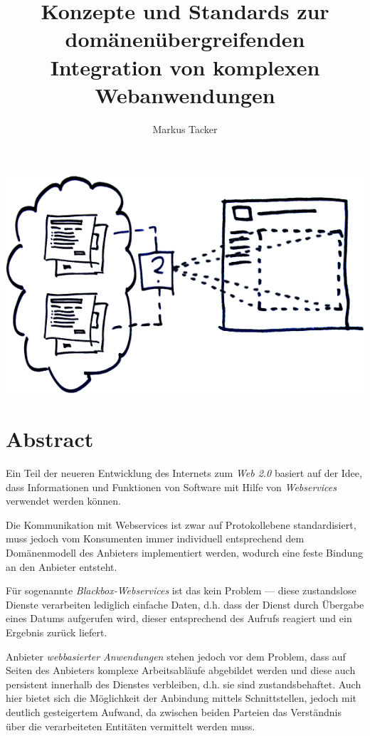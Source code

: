 \documentclass[10pt,a4paper]{article}
\begin{document}
\author{Markus Tacker}
\title{Konzepte und Standards zur domänenübergreifenden Integration von komplexen Webanwendungen}
\maketitle
\includegraphics[width=14cm]{skizze.png}
\pagebreak
\section*{Abstract}

Ein Teil der neueren Entwicklung des Internets zum \emph{Web 2.0} basiert auf der Idee, dass Informationen und Funktionen von Software mit Hilfe von \emph{Webservices} verwendet werden können. \cite{hn-web20}

Die Kommunikation mit Webservices ist zwar auf Protokollebene standardisiert, muss jedoch vom Konsumenten immer individuell entsprechend dem Domänenmodell des Anbieters implementiert werden, wodurch eine feste Bindung an den Anbieter entsteht.

Für sogenannte \emph{Blackbox-Webservices} ist das kein Problem --- diese zustandslose Dienste verarbeiten lediglich einfache Daten, d.h. dass der Dienst durch Übergabe eines Datums aufgerufen wird, dieser entsprechend des Aufrufs reagiert und ein Ergebnis zurück liefert.

Anbieter \emph{webbasierter Anwendungen} stehen jedoch vor dem Problem, dass auf Seiten des Anbieters komplexe Arbeitsabläufe abgebildet werden und diese auch persistent innerhalb des Dienstes verbleiben, d.h. sie sind zustandsbehaftet. Auch hier bietet sich die Möglichkeit der Anbindung mittels Schnittstellen, jedoch mit deutlich gesteigertem Aufwand, da zwischen beiden Parteien das Verständnis über die verarbeiteten Entitäten vermittelt werden muss. 
\end{document}
